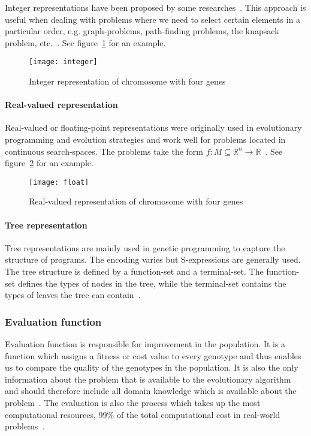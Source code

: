 Integer representations have been proposed by some researches~\cite{unter611evolutionary}. This approach is useful when dealing with problems where we need to select certain elements in a particular order, e.g. graph-problems, path-finding problems, the knapsack problem, etc.~\cite{Eiben201511}. See figure~\ref{fig:int} for an example.

\begin{figure}[H]
  \centering
  \texttt{[image: integer]}
  \caption{Integer representation of chromosome with four genes}
  \label{fig:int}
\end{figure}


\paragraph{Real-valued representation}

Real-valued or floating-point representations were originally used in evolutionary programming and evolution strategies and work well for problems located in continuous search-spaces. The problems take the form $f:M\subseteq \mathbb{R}^n \rightarrow \mathbb{R} $~\cite{back1997evolutionary}. See figure~\ref{fig:float} for an example.

\begin{figure}[H]
  \centering
  \texttt{[image: float]}
  \caption{Real-valued representation of chromosome with four genes}
  \label{fig:float}
\end{figure}

\paragraph{Tree representation}

Tree representations are mainly used in genetic programming to capture the structure of programs. The encoding varies but S-expressions are generally used. The tree structure is defined by a function-set and a terminal-set. The function-set defines the types of nodes in the tree, while the terminal-set contains the types of leaves the tree can contain~\cite{Eiben201511}.

\subsubsection{Evaluation function}

Evaluation function is responsible for improvement in the population. It is a function which assigns a fitness or cost value to every genotype and thus enables us to compare the quality of the genotypes in the population. It is also the only information about the problem that is available to the evolutionary algorithm and should therefore include all domain knowledge which is available about the problem~\cite{Eiben2015_whatevolutionary}. The evaluation is also the process which takes up the most computational resources, 99\% of the total computational cost in real-world problems~\cite{Eiben20021}.

